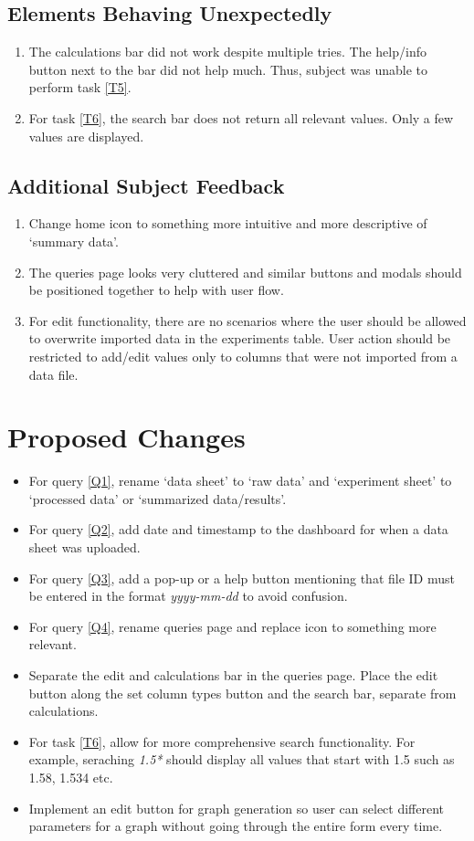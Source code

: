 \documentclass{article}
\begin{document}
\subsection{Elements Behaving Unexpectedly}
\begin{enumerate}
  \item The calculations bar did not work despite multiple tries. The help/info button next to the bar did not help much. Thus, subject was 
  unable to perform task \ref{T5}.
  \item For task \ref{T6}, the search bar does not return all relevant values. Only a few values are displayed.
\end{enumerate}

\subsection{Additional Subject Feedback}
\begin{enumerate}
  \item Change home icon to something more intuitive and more descriptive of `summary data'.
  \item The queries page looks very cluttered and similar buttons and modals should be positioned together to help with user flow.
  \item For edit functionality, there are no scenarios where the user should be allowed to overwrite imported data in the experiments table. 
  User action should be restricted to add/edit values only to columns that were not imported from a data file.
\end{enumerate}

\section{Proposed Changes}
\begin{itemize}
  \item For query \ref{Q1}, rename `data sheet' to `raw data' and `experiment sheet' to `processed data' or `summarized data/results'.
  \item For query \ref{Q2}, add date and timestamp to the dashboard for when a data sheet was uploaded.
  \item For query \ref{Q3}, add a pop-up or a help button mentioning that file ID must be entered in the format \emph{yyyy-mm-dd} to avoid 
  confusion.
  \item For query \ref{Q4}, rename queries page and replace icon to something more relevant.
  \item Separate the edit and calculations bar in the queries page. Place the edit button along the set column types button and the search bar,
  separate from calculations.
  \item For task \ref{T6}, allow for more comprehensive search functionality. For example, seraching \emph{1.5*} should display all values that start
  with 1.5 such as 1.58, 1.534 etc.
  \item Implement an edit button for graph generation so user can select different parameters for a graph without going through the entire form every time.
\end{itemize}
\end{document}
